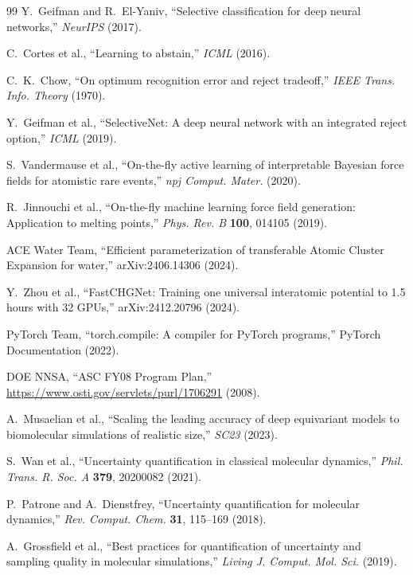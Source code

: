 \documentclass[11pt,a4paper]{article}
\begin{document}
\begin{thebibliography}{99}
Y.~Geifman and R.~El-Yaniv, ``Selective classification for deep neural networks,'' \textit{NeurIPS} (2017).

C.~Cortes et al., ``Learning to abstain,'' \textit{ICML} (2016).

C.~K.~Chow, ``On optimum recognition error and reject tradeoff,'' \textit{IEEE Trans. Info. Theory} (1970).

Y.~Geifman et al., ``SelectiveNet: A deep neural network with an integrated reject option,'' \textit{ICML} (2019).

S.~Vandermause et al., ``On-the-fly active learning of interpretable Bayesian force fields for atomistic rare events,'' \textit{npj Comput. Mater.} (2020).

R.~Jinnouchi et al., ``On-the-fly machine learning force field generation: Application to melting points,'' \textit{Phys. Rev. B} \textbf{100}, 014105 (2019).

ACE Water Team, ``Efficient parameterization of transferable Atomic Cluster Expansion for water,'' arXiv:2406.14306 (2024).

Y.~Zhou et al., ``FastCHGNet: Training one universal interatomic potential to 1.5 hours with 32 GPUs,'' arXiv:2412.20796 (2024).

PyTorch Team, ``torch.compile: A compiler for PyTorch programs,'' PyTorch Documentation (2022).

DOE NNSA, ``ASC FY08 Program Plan,'' \url{https://www.osti.gov/servlets/purl/1706291} (2008).

A.~Musaelian et al., ``Scaling the leading accuracy of deep equivariant models to biomolecular simulations of realistic size,'' \textit{SC23} (2023).

S.~Wan et al., ``Uncertainty quantification in classical molecular dynamics,'' \textit{Phil. Trans. R. Soc. A} \textbf{379}, 20200082 (2021).

P.~Patrone and A.~Dienstfrey, ``Uncertainty quantification for molecular dynamics,'' \textit{Rev. Comput. Chem.} \textbf{31}, 115--169 (2018).

A.~Grossfield et al., ``Best practices for quantification of uncertainty and sampling quality in molecular simulations,'' \textit{Living J. Comput. Mol. Sci.} (2019).


\end{thebibliography}
\end{document}
